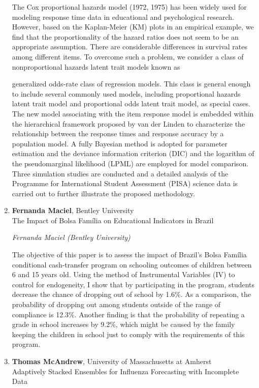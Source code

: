\begin{enumerate}
The Cox proportional hazards model (1972, 1975) has been widely used for modeling response time data in educational and psychological research. However, based on the Kaplan-Meier (KM) plots in an empirical example, we find that the proportionality of the hazard ratios does not seem to be an appropriate assumption. There are considerable differences in survival rates among different items.  To overcome such a problem, we consider a class of nonproportional hazards latent trait models known as

generalized odds-rate class of regression models. This class is general enough to include several commonly used models, including proportional hazards latent trait model and proportional odds latent trait model, as special cases. The new model associating with the item response model is embedded within the hierarchical framework proposed by van der Linden to characterize the relationship between the response times and response accuracy by a population model. A fully Bayesian method is adopted for parameter estimation and the deviance information criterion (DIC) and the logarithm of the pseudomarginal likelihood (LPML) are employed for model comparison. Three simulation studies are conducted and a detailed analysis of the Programme for International Student Assessment (PISA) science data is carried out to further illustrate the proposed methodology.

\item \textbf{Fernanda Maciel}, Bentley University \\
The Impact of Bolsa Família on Educational Indicators in Brazil

\emph{\footnotesize Fernanda Maciel (Bentley University)}

The objective of this paper is to assess the impact of Brazil's Bolsa Família conditional cash-transfer program on schooling outcomes of children between 6 and 15 years old. Using the method of Instrumental Variables (IV) to control for endogeneity, I show that by participating in the program, students decrease the chance of dropping out of school by 1.6\%. As a comparison, the probability of dropping out among students outside of the range of compliance is 12.3\%. Another finding is that the probability of repeating a grade in school increases by 9.2\%, which might be caused by the family keeping the children in school just to comply with the requirements of this program.

\item \textbf{Thomas McAndrew}, University of Massachusetts at Amherst \\
Adaptively Stacked Ensembles for Influenza Forecasting with Incomplete Data


\end{enumerate}
